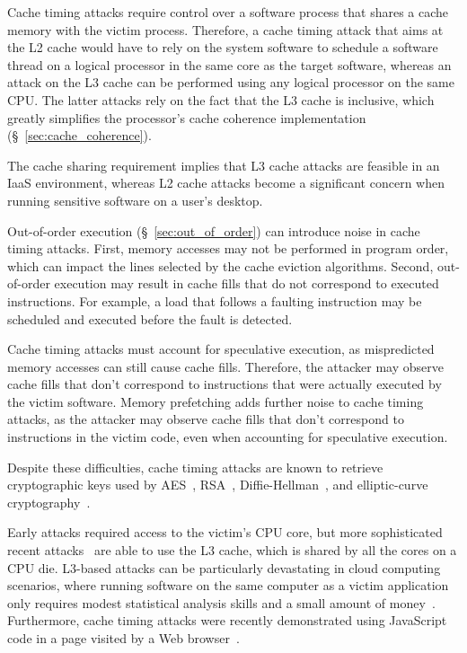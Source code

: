 
Cache timing attacks require control over a software process that shares a
cache memory with the victim process. Therefore, a cache timing attack that
aims at the L2 cache would have to rely on the system software to schedule a
software thread on a logical processor in the same core as the target software,
whereas an attack on the L3 cache can be performed using any logical processor
on the same CPU. The latter attacks rely on the fact that the L3 cache is
inclusive, which greatly simplifies the processor's cache coherence
implementation (\S~\ref{sec:cache_coherence}).

The cache sharing requirement implies that L3 cache attacks are feasible in an
IaaS environment, whereas L2 cache attacks become a significant concern when
running sensitive software on a user's desktop.

Out-of-order execution (\S~\ref{sec:out_of_order}) can introduce noise in cache
timing attacks. First, memory accesses may not be performed in program order,
which can impact the lines selected by the cache eviction algorithms. Second,
out-of-order execution may result in cache fills that do not correspond to
executed instructions. For example, a load that follows a faulting instruction
may be scheduled and executed before the fault is detected.

Cache timing attacks must account for speculative execution, as mispredicted
memory accesses can still cause cache fills. Therefore, the attacker may
observe cache fills that don't correspond to instructions that were actually
executed by the victim software. Memory prefetching adds further noise to cache
timing attacks, as the attacker may observe cache fills that don't correspond
to instructions in the victim code, even when accounting for speculative
execution.



Despite these difficulties, cache timing attacks are known to retrieve
cryptographic keys used by AES~\cite{osvik2006aes, bonneau2006aes},
RSA~\cite{brumley2005rsa}, Diffie-Hellman~\cite{kocher1996timing}, and
elliptic-curve cryptography~\cite{brumley2011ecc}.

Early attacks required access to the victim's CPU core, but more sophisticated
recent attacks~\cite{yarom2013llctiming, liu2015llctiming} are able to use the
L3 cache, which is shared by all the cores on a CPU die. L3-based attacks can
be particularly devastating in cloud computing scenarios, where running
software on the same computer as a victim application only requires modest
statistical analysis skills and a small amount of
money~\cite{ristenpart2009colocation}. Furthermore, cache timing attacks were
recently demonstrated using JavaScript code in a page visited by a Web
browser~\cite{oren2015jstiming}.

